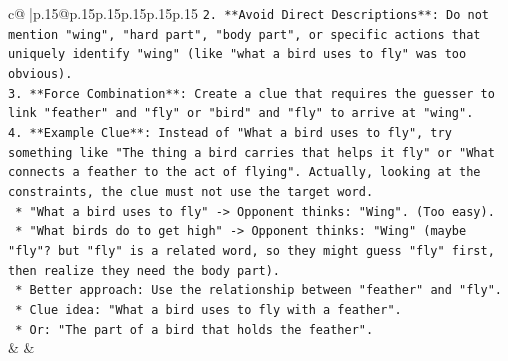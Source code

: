 \documentclass{article}
\begin{document}
{\begin{supertabular}{c@{$\;$}|p{.15\linewidth}@{}p{.15\linewidth}p{.15\linewidth}p{.15\linewidth}p{.15\linewidth}p{.15\linewidth}}
{{{\texttt{2.  **Avoid Direct Descriptions**: Do not mention "wing", "hard part", "body part", or specific actions that uniquely identify "wing" (like "what a bird uses to fly" was too obvious).} \\
\texttt{3.  **Force Combination**: Create a clue that requires the guesser to link "feather" and "fly" or "bird" and "fly" to arrive at "wing".} \\
\texttt{4.  **Example Clue**: Instead of "What a bird uses to fly", try something like "The thing a bird carries that helps it fly" or "What connects a feather to the act of flying". Actually, looking at the constraints, the clue must not use the target word.} \\
\texttt{    *   "What a bird uses to fly" {-}> Opponent thinks: "Wing". (Too easy).} \\
\texttt{    *   "What birds do to get high" {-}> Opponent thinks: "Wing" (maybe "fly"? but "fly" is a related word, so they might guess "fly" first, then realize they need the body part).} \\
\texttt{    *   Better approach: Use the relationship between "feather" and "fly".} \\
\texttt{    *   Clue idea: "What a bird uses to fly with a feather".} \\
\texttt{    *   Or: "The part of a bird that holds the feather".} \\
            }
        }
    }
    & & \\ \\

\end{supertabular}
}
\end{document}
